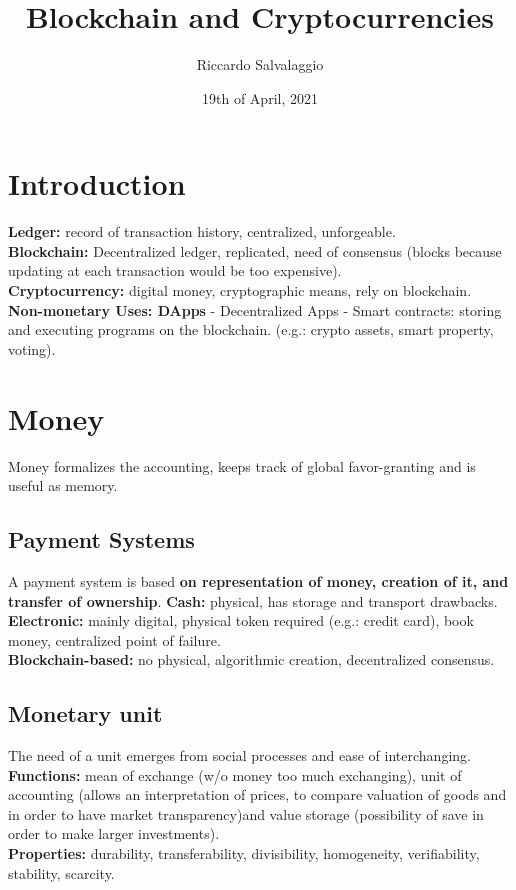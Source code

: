 \documentclass{article}
\title{Blockchain and Cryptocurrencies}
\author{Riccardo Salvalaggio}
\date{19th of April, 2021}
\begin{document}
\maketitle
\newpage
\tableofcontents
\newpage

\section{Introduction}
\textbf{Ledger: }record of transaction history, centralized, unforgeable.\\
\textbf{Blockchain: }Decentralized ledger, replicated, need of consensus (blocks because updating at each transaction would be too expensive).\\
\textbf{Cryptocurrency: }digital money, cryptographic means, rely on blockchain.\\
\textbf{Non-monetary Uses: DApps} - Decentralized Apps - Smart contracts: storing and executing programs on the blockchain. (e.g.: crypto assets, smart property, voting).\\


\section{Money}
Money formalizes the accounting, keeps track of global favor-granting and is useful as memory.
\subsection{Payment Systems}
A payment system is based \textbf{on representation of money, creation of it, and transfer of ownership}.
\textbf{Cash: }physical, has storage and transport drawbacks.\\
\textbf{Electronic: }mainly digital, physical token required (e.g.: credit card), book money, centralized point of failure.\\
\textbf{Blockchain-based: }no physical, algorithmic creation, decentralized consensus.\\
\subsection{Monetary unit}
The need of a unit emerges from social processes and ease of interchanging. \textbf{Functions: }mean of exchange (w/o money too much exchanging), unit of accounting (allows an interpretation of prices, to compare valuation of goods and in order to have market transparency)and value storage (possibility of save in order to make larger investments).\\
\textbf{Properties: }durability, transferability, divisibility, homogeneity, verifiability, stability, scarcity.
\end{document}
